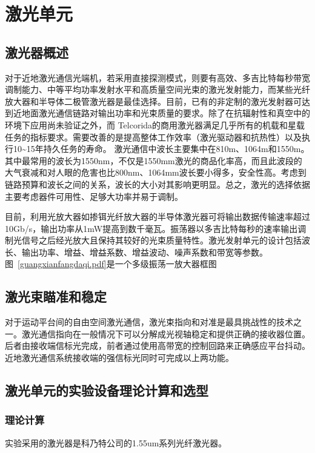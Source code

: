\chapter{激光单元}
\section{激光器概述}
对于近地激光通信光端机，若采用直接探测模式，则要有高效、多吉比特每秒带宽调制能力、中等平均功率发射水平和高质量空间光束的激光发射能力，而某些光纤放大器和半导体二极管激光器是最佳选择。目前，已有的非定制的激光发射器可达到近地面激光通信链路对输出功率和光束质量的要求。除了在抗辐射性和真空中的环境下应用尚未验证之外，而 Telcorida的商用激光器满足几乎所有的机载和星载任务的指标要求。需要改善的是提高整体工作效率（激光驱动器和抗热性）以及执行10\~{}15年持久任务的寿命。
激光通信中波长主要集中在810m、1064m和1550m。其中最常用的波长为1550nm，不仅是1550mm激光的商品化率高，而且此波段的大气衰减和对人眼的危害也比800nm、1064mm波长要小得多，安全性高。考虑到链路预算和波长之间的关系，波长的大小对其影响更明显。总之，激光的选择依据主要考虑器件可用性、足够大功率并易于调制。

目前，利用光放大器如掺铒光纤放大器的半导体激光器可将输出数据传输速率超过10Gb/s，输出功率从1mW提高到数千毫瓦。振荡器以多吉比特每秒的速率输出调制光信号之后经光放大且保持其较好的光束质量特性。激光发射单元的设计包括波长、输出功率、增益、增益系数、增益波动、噪声系数和带宽等参数。图~\ref{guangxianfangdaqi.pdf}是一个多级振荡一放大器框图


\section{激光束瞄准和稳定}
对于运动平台间的自由空间激光通信，激光束指向和对准是最具挑战性的技术之一。激光通信指向在一般情况下可以分解成光视轴稳定和提供正确的接收器位置。后者由接收端信标光完成，前者通过使用高带宽的控制回路来正确感应平台抖动。近地激光通信系统接收端的强信标光同时可完成以上两功能。
\section{激光单元的实验设备理论计算和选型}

\subsection{理论计算}
实验采用的激光器是科乃特公司的1.55um系列光纤激光器。


